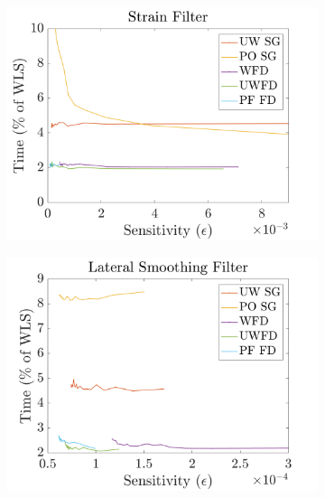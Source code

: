 \begin{figure}
	\centering
	\begin{subfigure}{0.49\textwidth}
		\centering
		\includegraphics[width=\textwidth]{figures/sensitivity_2dtime_fr.png}
	\end{subfigure}
	\begin{subfigure}{0.49\textwidth}
		\centering
		\includegraphics[width=\textwidth]{figures/sensitivity_2dtime_lr.png}
	\end{subfigure}
	\\
	\begin{subfigure}{0.49\textwidth}
		\centering

\end{subfigure}
\end{figure}

